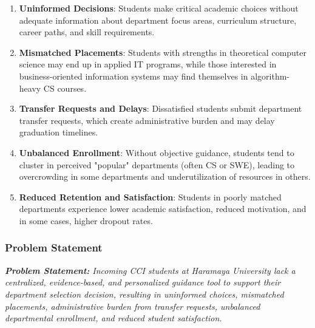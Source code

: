 \documentclass[12pt, a4paper]{article}
\begin{document}
\begin{enumerate}[leftmargin=1.5em, itemsep=3pt]
    \item \textbf{Uninformed Decisions}: Students make critical academic choices without adequate information about department focus areas, curriculum structure, career paths, and skill requirements.
    
    \item \textbf{Mismatched Placements}: Students with strengths in theoretical computer science may end up in applied IT programs, while those interested in business-oriented information systems may find themselves in algorithm-heavy CS courses.
    
    \item \textbf{Transfer Requests and Delays}: Dissatisfied students submit department transfer requests, which create administrative burden and may delay graduation timelines.
    
    \item \textbf{Unbalanced Enrollment}: Without objective guidance, students tend to cluster in perceived "popular" departments (often CS or SWE), leading to overcrowding in some departments and underutilization of resources in others.
    
    \item \textbf{Reduced Retention and Satisfaction}: Students in poorly matched departments experience lower academic satisfaction, reduced motivation, and in some cases, higher dropout rates.
\end{enumerate}

\subsubsection*{Problem Statement}

\begin{tcolorbox}[
    enhanced, colback=lightblue, colframe=uniblue,
    arc=4pt, boxrule=1pt, top=6pt, bottom=6pt, left=8pt, right=8pt
]
\textit{\textbf{Problem Statement:} Incoming CCI students at Haramaya University lack a centralized, evidence-based, and personalized guidance tool to support their department selection decision, resulting in uninformed choices, mismatched placements, administrative burden from transfer requests, unbalanced departmental enrollment, and reduced student satisfaction.}
\end{tcolorbox}

\vspace{6pt}
\end{document}
